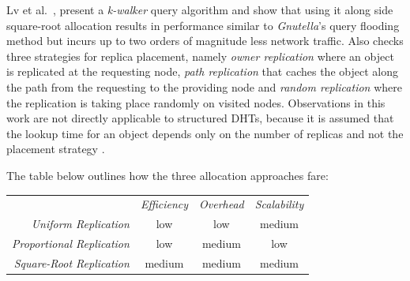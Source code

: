 Lv et al.~\cite{LCCLS2002}, present a \emph{k-walker} query algorithm and show
that using it along side square-root allocation results in performance similar to
\emph{Gnutella}'s query flooding method but incurs up to two
orders of magnitude less network traffic. Also checks three strategies for
replica placement, namely \emph{owner replication} where an object is replicated
at the requesting node, \emph{path replication} that caches the object along the
path from the requesting to the providing node and \emph{random replication}
where the replication is taking place randomly on visited nodes. Observations in
this work are not directly applicable to structured DHTs, because it is assumed
that the lookup time for an object depends only on the number of replicas and
not the placement strategy \cite{RS2004}.


The table below outlines how the three allocation approaches fare:
\begin{center}
{\footnotesize
\begin{tabular}{rccc}
\multicolumn{1}{r}{} &
\multicolumn{1}{c}{\emph{Efficiency}} &
\multicolumn{1}{c}{\emph{Overhead}} &
\multicolumn{1}{c}{\emph{Scalability}}
\\
\cline{2-4}
\emph{Uniform Replication} &
low &
low &
%
medium \\
\emph{Proportional Replication} &
low &
medium &
%
low \\
\emph{Square-Root Replication} &
medium &
medium &
medium \\
\end{tabular}
}
\end{center}

